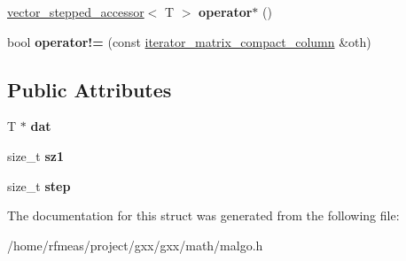 \begin{DoxyCompactItemize}
\item 
\hyperlink{classmalgo_1_1vector__stepped__accessor}{vector\+\_\+stepped\+\_\+accessor}$<$ T $>$ {\bfseries operator$\ast$} ()\hypertarget{structmalgo_1_1iterator__matrix__compact__column_a676b5429be0013ab36f136baaa7036d0}{}\label{structmalgo_1_1iterator__matrix__compact__column_a676b5429be0013ab36f136baaa7036d0}

\item 
bool {\bfseries operator!=} (const \hyperlink{structmalgo_1_1iterator__matrix__compact__column}{iterator\+\_\+matrix\+\_\+compact\+\_\+column} \&oth)\hypertarget{structmalgo_1_1iterator__matrix__compact__column_a9a56239a2aec70755353d010d86a3c42}{}\label{structmalgo_1_1iterator__matrix__compact__column_a9a56239a2aec70755353d010d86a3c42}

\end{DoxyCompactItemize}
\subsection*{Public Attributes}
\begin{DoxyCompactItemize}
\item 
T $\ast$ {\bfseries dat}\hypertarget{structmalgo_1_1iterator__matrix__compact__column_aaa5532edfba733729f9218e4dc5448be}{}\label{structmalgo_1_1iterator__matrix__compact__column_aaa5532edfba733729f9218e4dc5448be}

\item 
size\+\_\+t {\bfseries sz1}\hypertarget{structmalgo_1_1iterator__matrix__compact__column_afdd748613137e2a43fa0e9ec65aebc8c}{}\label{structmalgo_1_1iterator__matrix__compact__column_afdd748613137e2a43fa0e9ec65aebc8c}

\item 
size\+\_\+t {\bfseries step}\hypertarget{structmalgo_1_1iterator__matrix__compact__column_a9efd8b4b92c1259796aedcd3e2b92c85}{}\label{structmalgo_1_1iterator__matrix__compact__column_a9efd8b4b92c1259796aedcd3e2b92c85}

\end{DoxyCompactItemize}


The documentation for this struct was generated from the following file\+:\begin{DoxyCompactItemize}
\item 
/home/rfmeas/project/gxx/gxx/math/malgo.\+h\end{DoxyCompactItemize}
